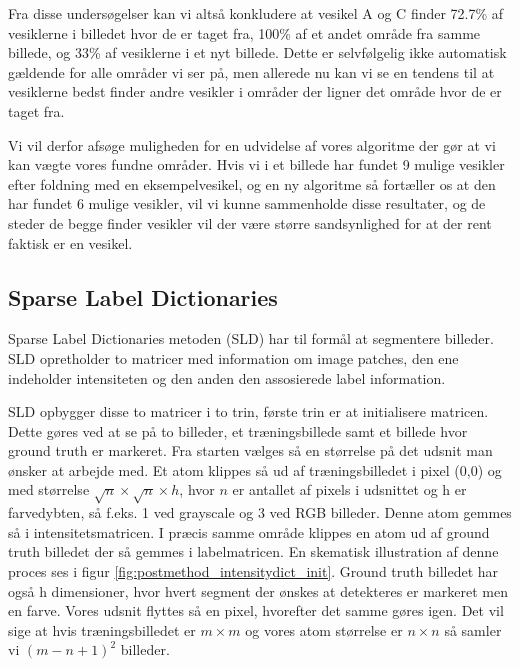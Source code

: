 Fra disse undersøgelser kan vi altså konkludere at vesikel A og C finder 72.7\% af vesiklerne i billedet hvor de er taget fra, 100\% af et andet område fra samme billede, og 33\% af vesiklerne i et nyt billede. Dette er selvfølgelig ikke automatisk gældende for alle områder vi ser på, men allerede nu kan vi se en tendens til at vesiklerne bedst finder andre vesikler i områder der ligner det område hvor de er taget fra.

Vi vil derfor afsøge muligheden for en udvidelse af vores algoritme der gør at vi kan vægte vores fundne områder. Hvis vi i et billede har fundet 9 mulige vesikler efter foldning med en eksempelvesikel, og en ny algoritme så fortæller os at den har fundet 6 mulige vesikler, vil vi kunne sammenholde disse resultater, og de steder de begge finder vesikler vil der være større sandsynlighed for at der rent faktisk er en vesikel.

\subsection{Sparse Label Dictionaries}	%

Sparse Label Dictionaries metoden (SLD) har til formål at segmentere billeder. SLD opretholder to matricer med information om image patches, den ene indeholder intensiteten og den anden den assosierede label information.

SLD opbygger disse to matricer i to trin, første trin er at initialisere matricen. Dette gøres ved at se på to billeder, et træningsbillede samt et billede hvor ground truth er markeret. Fra starten vælges så en størrelse på det udsnit man ønsker at arbejde med. Et atom klippes så ud af træningsbilledet i pixel (0,0) og med størrelse $\sqrt{n}\times\sqrt{n}\times h$, hvor $n$ er antallet af pixels i udsnittet og h er farvedybten, så f.eks. 1 ved grayscale og 3 ved RGB billeder. Denne atom gemmes så i intensitetsmatricen. I præcis samme område klippes en atom ud af ground truth billedet der så gemmes i labelmatricen. En skematisk illustration af denne proces ses i figur \ref{fig:postmethod_intensitydict_init}. Ground truth billedet har også h dimensioner, hvor hvert segment der ønskes at detekteres er markeret men en farve. Vores udsnit flyttes så en pixel, hvorefter det samme gøres igen. Det vil sige at hvis træningsbilledet er $m\times m$ og vores atom størrelse er $n\times n$ så samler vi $(m-n+1)^2$ billeder. 

